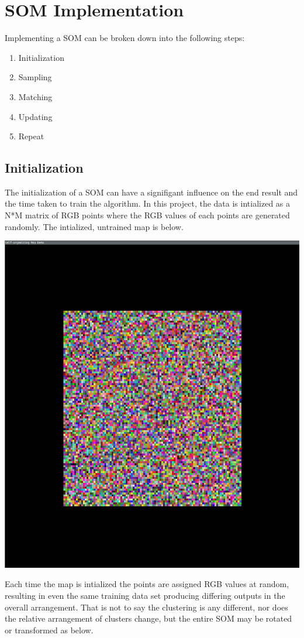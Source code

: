 \documentclass[11pt]{article}
\begin{document}
\section{SOM Implementation}
Implementing a SOM can be broken down into the following steps:
\begin{enumerate}
\item{Initialization}
\item{Sampling}
\item{Matching}
\item{Updating}
\item{Repeat}
\end{enumerate}
\subsection{Initialization}
The initialization of a SOM can have a signifigant influence on the end result and the time taken to train the algorithm. In this project, the data is intialized as a N*M matrix of RGB points where the RGB values of each points are generated randomly. The intialized, untrained map is below.

\includegraphics[scale=.15]{cuda_som_init}

Each time the map is intialized the points are assigned RGB values at random, resulting in even the same training data set producing differing outputs in the overall arrangement. That is not to say the clustering is any different, nor does the relative arrangement of clusters change, but the entire SOM may be rotated or transformed as below. 
\end{document}
